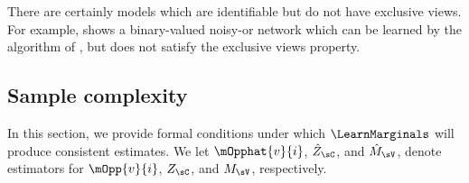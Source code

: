 There are certainly models which are identifiable but do not have exclusive views.
For example,  shows
  a binary-valued noisy-or network which can be
  learned by the algorithm of \citet{halpern13noisyor},
  but does not satisfy the exclusive views property.

\subsection{Sample complexity}
\label{sec:sampleComplexity}

In this section, we provide formal conditions under which $\LearnMarginals$
will produce consistent estimates.
We let
$\mOpphat{v}{i}$,
$\hat Z_\sC$,
and $\hat M_\sV$,
denote estimators for
$\mOpp{v}{i}$,
$Z_\sC$,
and $M_\sV$,
respectively.


